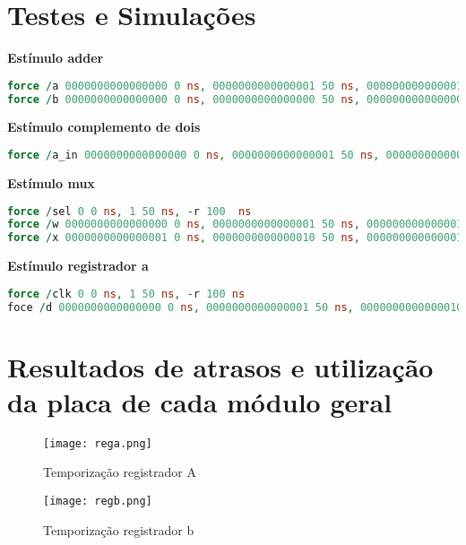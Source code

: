 \documentclass[a4paper]{article}
\begin{document}
\bigskip
\pagebreak
\section{\textbf{Testes e Simulações}}

\textbf{Estímulo adder}
\begin{lstlisting}[language=VHDL]
force /a 0000000000000000 0 ns, 0000000000000001 50 ns, 0000000000000010 100 ns, 0000000000000011 150 ns
force /b 0000000000000000 0 ns, 0000000000000000 50 ns, 0000000000000001 100 ns, 0000000000000010 150 ns
\end{lstlisting}
\smallskip

\textbf{Estímulo complemento de dois}
\begin{lstlisting}[language=VHDL]
force /a_in 0000000000000000 0 ns, 0000000000000001 50 ns, 0000000000000010 100 ns, 0000000000000011 150 ns
\end{lstlisting}
\smallskip

\textbf{Estímulo mux}
\begin{lstlisting}[language=VHDL]
force /sel 0 0 ns, 1 50 ns, -r 100  ns
force /w 0000000000000000 0 ns, 0000000000000001 50 ns, 0000000000000010 100 ns, 0000000000000011 150 ns
force /x 0000000000000001 0 ns, 0000000000000010 50 ns, 0000000000000011 100 ns, 0000000000000010 150 ns
\end{lstlisting}
\smallskip

\textbf{Estímulo registrador a}
\begin{lstlisting}[language=VHDL]
force /clk 0 0 ns, 1 50 ns, -r 100 ns
foce /d 0000000000000000 0 ns, 0000000000000001 50 ns, 0000000000000010 100 ns, 0000000000000011 150 ns
\end{lstlisting}
\smallskip

\section{\textbf{Resultados de atrasos e utilização da placa de cada módulo geral}}

\begin{figure}[H]
\centering
\texttt{[image: rega.png]}
\caption{Temporização registrador A \label{Figura 1}}
\end{figure}
\smallskip

\begin{figure}[H]
\centering
\texttt{[image: regb.png]}
\caption{Temporização registrador b \label{Figura 2}}
\end{figure}
\smallskip
\end{document}
